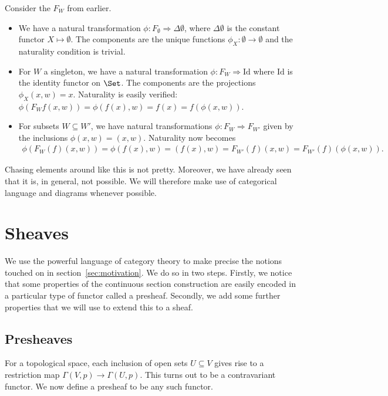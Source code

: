 \documentclass{article}
\begin{document}
\begin{example}
  Consider the $F_W$ from earlier.
  \begin{itemize}
    \item We have a natural transformation $\phi:F_\emptyset \Rightarrow
      \Delta\emptyset$, where $\Delta\emptyset$ is the constant functor
      $X\mapsto\emptyset$. The components are the unique functions
      $\phi_X:\emptyset\to\emptyset$ and the naturality condition is trivial.
    \item For $W$ a singleton, we have a natural transformation $\phi:F_W\Rightarrow
      \text{Id}$ where $\text{Id}$ is the identity functor on $\Set$. The
      components are the projections $\phi_X(x,w)=x$. Naturality is easily
      verified: $\phi(F_W f(x,w))=\phi(f(x),w) = f(x) = f(\phi(x,w))$.
    \item For subsets $W\subseteq W'$, we have natural transformations
      $\phi:F_W\Rightarrow F_{W'}$ given by the inclusions $\phi(x,w) = (x,w)$.
      Naturality now becomes
      \begin{align*}
        \phi(F_W(f)(x,w)) = \phi(f(x),w) = (f(x),w) = F_{W'}(f)(x,w) =
        F_{W'}(f)(\phi(x,w)).
      \end{align*}
  \end{itemize}
\end{example}

Chasing elements around like this is not pretty. Moreover, we have already
seen that it is, in general, not possible. We will therefore make use of
categorical language and diagrams whenever possible.


\section{Sheaves}\label{sec:sheaves}

We use the powerful language of category theory to make precise the
notions touched on in section~\ref{sec:motivation}.
We do so in two steps. Firstly, we notice that some properties of
the continuous section construction are easily encoded in a particular
type of functor called a presheaf. Secondly, we add some further
properties that we will use to extend this to a sheaf.

\subsection{Presheaves}

For a topological space, each inclusion of open sets $U\subseteq V$
gives rise to a restriction map $\Gamma(V,p)\to\Gamma(U,p)$.
This turns out to be a contravariant functor. We now define a presheaf
to be any such functor.
\end{document}

